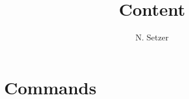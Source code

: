\documentclass[12pt]{article}      %
\title{Content \LaTeXe}	%
\author{N. Setzer}	%
\begin{document}

\maketitle




%


%
%
%
%
%


\section{Commands}
%
\label{Section:Commands}
%
\end{document}
